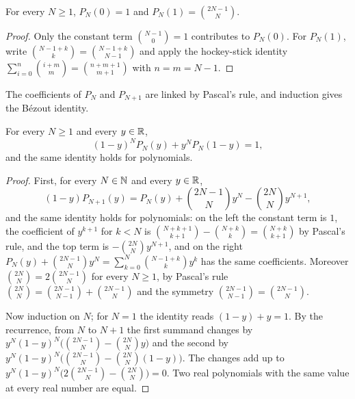 \begin{lemma}
\label{lem:daub-poly-values}
\leanok
{}
For every $N \geq 1$, $P_N(0) = 1$ and $P_N(1) = \binom{2N-1}{N}$.
\end{lemma}

\begin{proof}
\leanok
Only the constant term $\binom{N-1}{0} = 1$ contributes to $P_N(0)$. For $P_N(1)$, write
$\binom{N-1+k}{k} = \binom{N-1+k}{N-1}$ and apply the hockey-stick identity
$\sum_{i=0}^{n} \binom{i+m}{m} = \binom{n+m+1}{m+1}$ with $n = m = N - 1$.
\end{proof}

The coefficients of $P_N$ and $P_{N+1}$ are linked by Pascal's rule, and induction gives the
B\'ezout identity.

\begin{theorem}
\label{thm:daub-bezout}
\leanok
{}
For every $N \geq 1$ and every $y \in \mathbb{R}$,
\[
  (1 - y)^N P_N(y) + y^N P_N(1 - y) = 1 ,
\]
and the same identity holds for polynomials.
\end{theorem}

\begin{proof}
\leanok
First, for every $N \in \mathbb{N}$ and every $y \in \mathbb{R}$,
\[
  (1 - y) P_{N+1}(y) = P_N(y) + \binom{2N-1}{N} y^N - \binom{2N}{N} y^{N+1} ,
\]
and the same identity holds for polynomials: on the left the constant term is $1$, the
coefficient of $y^{k+1}$ for $k < N$ is $\binom{N+k+1}{k+1} - \binom{N+k}{k} = \binom{N+k}{k+1}$
by Pascal's rule, and the top term is $-\binom{2N}{N} y^{N+1}$, and on the right
$P_N(y) + \binom{2N-1}{N} y^N = \sum_{k=0}^{N} \binom{N-1+k}{k} y^k$ has the same coefficients.
Moreover $\binom{2N}{N} = 2 \binom{2N-1}{N}$ for every $N \geq 1$, by Pascal's rule
$\binom{2N}{N} = \binom{2N-1}{N-1} + \binom{2N-1}{N}$ and the symmetry
$\binom{2N-1}{N-1} = \binom{2N-1}{N}$.

Now induction on $N$; for $N = 1$ the identity reads $(1 - y) + y = 1$. By the recurrence, from
$N$ to $N + 1$ the first summand changes by
$y^N (1 - y)^N \bigl(\binom{2N-1}{N} - \binom{2N}{N} y\bigr)$ and the second by
$y^N (1 - y)^N \bigl(\binom{2N-1}{N} - \binom{2N}{N} (1 - y)\bigr)$. The changes add up to
$y^N (1 - y)^N \bigl(2 \binom{2N-1}{N} - \binom{2N}{N}\bigr) = 0$. Two real polynomials with the
same value at every real number are equal.
\end{proof}

